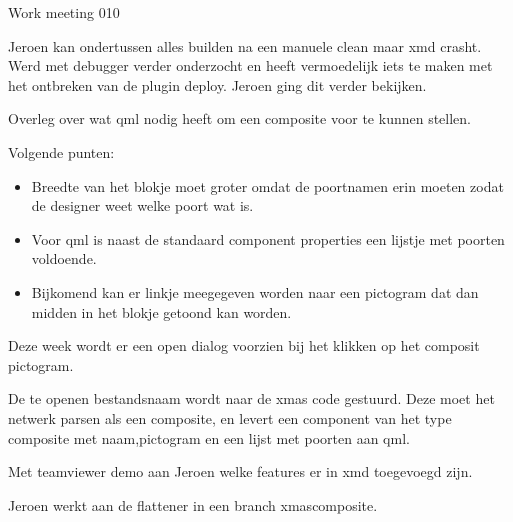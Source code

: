 \documentclass[a4paper,final]{article}
\begin{document}
\begin{Minutes}{Work meeting 010}
\subtitle{Midweek meeting}

\maketitle%


Jeroen kan ondertussen alles builden na een manuele clean maar xmd crasht.
Werd met debugger verder onderzocht en heeft vermoedelijk iets te maken
met het ontbreken van de plugin deploy. Jeroen ging dit verder bekijken.


Overleg over wat qml nodig heeft om een composite voor te kunnen stellen.

Volgende punten:
\begin{itemize}
	\item Breedte van het blokje moet groter omdat de poortnamen erin
		moeten zodat de designer weet welke poort wat is.
	\item Voor qml is naast de standaard component properties
		een lijstje met poorten voldoende.
	\item Bijkomend kan er linkje meegegeven worden naar
		een pictogram dat dan midden in het blokje getoond
		kan worden.
\end{itemize}

Deze week wordt er een open dialog voorzien bij het klikken op het composit pictogram.

De te openen bestandsnaam wordt naar de xmas code gestuurd.
Deze moet het netwerk parsen als een composite, en levert een component
van het type composite met naam,pictogram en een lijst met poorten aan
qml.

Met teamviewer demo aan Jeroen welke features er in xmd toegevoegd zijn.

Jeroen werkt aan de flattener in een branch xmascomposite.



\end{Minutes}
\end{document}
